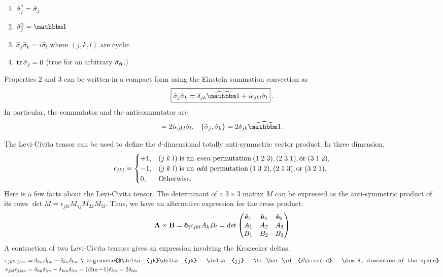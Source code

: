 \vspace{0.5em}
\begin{enumerate}
	\item $\hat\sigma_j^{\dagger} = \hat\sigma_j$
	\item $\hat\sigma_j^2 = \id$
	\item $\hat\sigma_j \hat\sigma_k = i\hat\sigma_l$ where $(j,k,l)$ are cyclic.
	\item $\tr\hat\sigma_j=0$ (true for an arbitrary $\hat\sigma_{\bf \hat n}$.)
\end{enumerate}
Properties 2 and 3 can be written in a compact form using the Einstein summation convection as
\begin{align}
	\boxed{\hat\sigma_j \hat\sigma_k = \delta_{jk}\op\id + i\epsilon_{jkl}\hat\sigma_l}\, .
\end{align}
In particular, the commutator and the anticommutator are
\begin{align}
	[\hat\sigma_j,\hat\sigma_k] = 2i\epsilon_{jkl}\hat\sigma_l, &&
	\{\hat\sigma_j,\hat\sigma_k\} = 2\delta_{jk}\op\id.
\end{align}

\begin{mybox}
	The Levi-Civita tensor can be used to define the $d$-dimensional totally anti-symmetric vector product. In three dimension,
	\begin{align}
		\epsilon_{jkl} = 
		\begin{cases}
			+1, &(j\;k\;l) \; \textrm{is an \emph{even} permutation} \: (1\; 2\; 3), (2\; 3\; 1), \textrm{or} \; (3\; 1\; 2), \\
			-1, &(j\;k\;l) \; \textrm{is an \emph{odd} permutation} \: (1\; 3\; 2), (2\; 1\; 3), \textrm{or} \; (3\; 2\; 1), \\
			0, &\mathrm{Otherwise}.
		\end{cases}
	\end{align} 
	Here is a few facts about the Levi-Civita tensor. The determinant of a $3\times3$ matrix $M$ can be expressed as the anti-symmetric product of its rows $\det M = \epsilon_{jkl} M_{1j}M_{2k} M_{3l}$. Thus, we have an alternative expression for the cross product:
	\begin{align}
		\vb{A \times B} = \vb{\hat e_j} \epsilon_{jkl} A_k B_l = \det \mqty(\vb{\hat e}_1 & \vb{\hat e}_2 & \vb{\hat e}_3  \\ A_1 & A_2 & A_3 \\ B_1 & B_2 & B_3 ) 
	\end{align}
	A contraction of two Levi-Civita tensors gives an expression involving the Kronecker deltas.
	\begin{align}
		\epsilon_{jkl}\epsilon_{jmn} &= \delta_{km} \delta_{lm} - \delta_{kn} \delta_{lm}, 
		\marginnote{$\delta_{jk}\delta_{jk} = \delta_{jj} = \tr \hat\id_{d\times d} = \dim$, dimension of the space}\\
		\epsilon_{jkl}\epsilon_{jkm} &= \delta_{kk}\delta_{lm} - \delta_{km} \delta_{lm} = (\dim-1)\delta_{lm} = 2\delta_{lm}
	\end{align}
\end{mybox}

